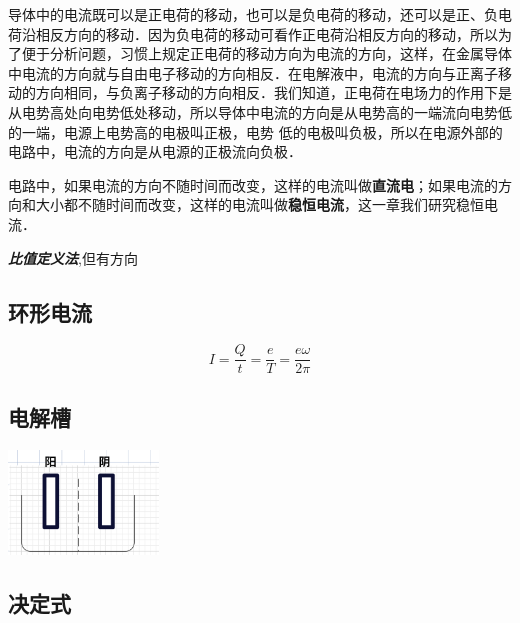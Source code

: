 \documentclass[10pt,cn]{elegantbook}
\begin{document}
       导体中的电流既可以是正电荷的移动，也可以是负电荷的移动，还可以是正、负电荷沿相反方向的移动．因为负电荷的移动可看作正电荷沿相反方向的移动，所以为了便于分析问题，习惯上规定正电荷的移动方向为电流的方向，这样，在金属导体中电流的方向就与自由电子移动的方向相反．在电解液中，电流的方向与正离子移动的方向相同，与负离子移动的方向相反．我们知道，正电荷在电场力的作用下是从电势高处向电势低处移动，所以导体中电流的方向是从电势高的一端流向电势低的一端，电源上电势高的电极叫正极，电势
       低的电极叫负极，所以在电源外部的电路中，电流的方向是从电源的正极流向负极．
       
       电路中，如果电流的方向不随时间而改变，这样的电流叫做\textbf{直流电}；如果电流的方向和大小都不随时间而改变，这样的电流叫做\textbf{稳恒电流}，这一章我们研究稳恒电流．
       
       \textbf{\textit{比值定义法}},但有方向
       
       \subsection{环形电流}
       
       
       $$I=\dfrac{Q}{t}=\dfrac{e}{T}=\dfrac{e \omega}{2\pi}$$
       
       \subsection{电解槽}
       

    \begin{center}
    \includegraphics[max width=0.3\textwidth]{image/20240708-2.jpg}
    \end{center}
    
     \subsection{决定式}
     
\end{document}
